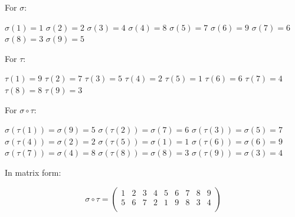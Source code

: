 \documentclass[a4paper]{article}
\begin{document}
\begin{myparindent}{0pt}
For $\sigma$:

$\sigma(1) = 1$ \newline
$\sigma(2) = 2$ \newline
$\sigma(3) = 4$ \newline
$\sigma(4) = 8$ \newline
$\sigma(5) = 7$ \newline
$\sigma(6) = 9$ \newline
$\sigma(7) = 6$ \newline
$\sigma(8) = 3$ \newline
$\sigma(9) = 5$ \newline

For $\tau$:

$\tau(1) = 9$ \newline
$\tau(2) = 7$ \newline
$\tau(3) = 5$ \newline
$\tau(4) = 2$ \newline
$\tau(5) = 1$ \newline
$\tau(6) = 6$ \newline
$\tau(7) = 4$ \newline
$\tau(8) = 8$ \newline
$\tau(9) = 3$ \newline

For $\sigma \circ \tau$:

$\sigma(\tau(1)) = \sigma(9) = 5$ \newline
$\sigma(\tau(2)) = \sigma(7) = 6$ \newline
$\sigma(\tau(3)) = \sigma(5) = 7$ \newline
$\sigma(\tau(4)) = \sigma(2) = 2$ \newline
$\sigma(\tau(5)) = \sigma(1) = 1$ \newline
$\sigma(\tau(6)) = \sigma(6) = 9$ \newline
$\sigma(\tau(7)) = \sigma(4) = 8$ \newline
$\sigma(\tau(8)) = \sigma(8) = 3$ \newline
$\sigma(\tau(9)) = \sigma(3) = 4$ \newline

In matrix form:

\[
    \sigma \circ \tau =
    \begin{pmatrix}
        1 & 2 & 3 & 4 & 5 & 6 & 7 & 8 & 9 \\
        5 & 6 & 7 & 2 & 1 & 9 & 8 & 3 & 4 \\
    \end{pmatrix}
\]


\end{myparindent}
\end{document}
